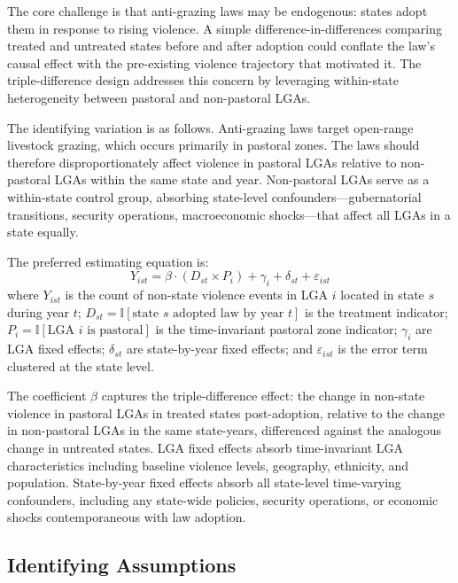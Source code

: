 \documentclass[12pt]{article}
\newcommand{\ind}{\mathbb{I}}
\begin{document}
The core challenge is that anti-grazing laws may be endogenous: states adopt them in response to rising violence. A simple difference-in-differences comparing treated and untreated states before and after adoption could conflate the law's causal effect with the pre-existing violence trajectory that motivated it. The triple-difference design addresses this concern by leveraging within-state heterogeneity between pastoral and non-pastoral LGAs.

The identifying variation is as follows. Anti-grazing laws target open-range livestock grazing, which occurs primarily in pastoral zones. The laws should therefore disproportionately affect violence in pastoral LGAs relative to non-pastoral LGAs within the same state and year. Non-pastoral LGAs serve as a within-state control group, absorbing state-level confounders---gubernatorial transitions, security operations, macroeconomic shocks---that affect all LGAs in a state equally.

The preferred estimating equation is:
\begin{equation}
Y_{ist} = \beta \cdot (D_{st} \times P_i) + \gamma_{i} + \delta_{st} + \varepsilon_{ist}
\label{eq:ddd}
\end{equation}
where $Y_{ist}$ is the count of non-state violence events in LGA $i$ located in state $s$ during year $t$; $D_{st} = \ind[\text{state } s \text{ adopted law by year } t]$ is the treatment indicator; $P_i = \ind[\text{LGA } i \text{ is pastoral}]$ is the time-invariant pastoral zone indicator; $\gamma_i$ are LGA fixed effects; $\delta_{st}$ are state-by-year fixed effects; and $\varepsilon_{ist}$ is the error term clustered at the state level.

The coefficient $\beta$ captures the triple-difference effect: the change in non-state violence in pastoral LGAs in treated states post-adoption, relative to the change in non-pastoral LGAs in the same state-years, differenced against the analogous change in untreated states. LGA fixed effects absorb time-invariant LGA characteristics including baseline violence levels, geography, ethnicity, and population. State-by-year fixed effects absorb all state-level time-varying confounders, including any state-wide policies, security operations, or economic shocks contemporaneous with law adoption.

\subsection{Identifying Assumptions}
\end{document}
